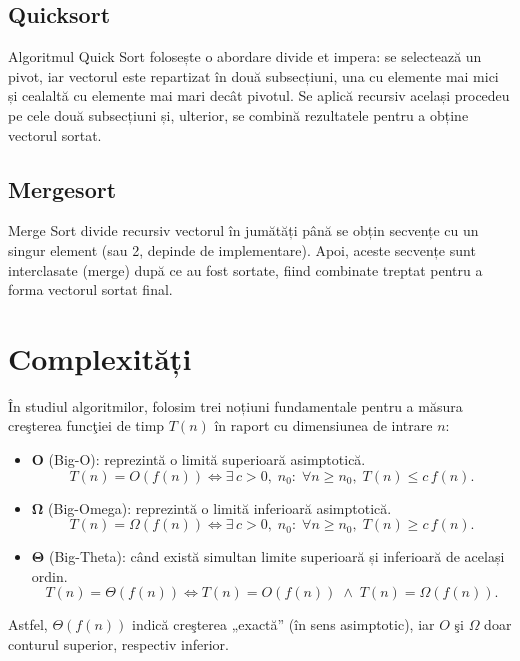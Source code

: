 \documentclass[11pt,a4paper]{article}
\theoremstyle{definition}
\theoremstyle{plain}
\theoremstyle{remark}
\begin{document}
\subsection{Quicksort}
Algoritmul Quick Sort folosește o abordare divide et impera: se selectează un pivot, iar vectorul este repartizat în două subsecțiuni, una cu elemente mai mici și cealaltă cu elemente mai mari decât pivotul. Se aplică recursiv același procedeu pe cele două subsecțiuni și, ulterior, se combină rezultatele pentru a obține vectorul sortat.\\

\subsection{Mergesort}
Merge Sort divide recursiv vectorul în jumătăți până se obțin secvențe cu un singur element (sau 2, depinde de implementare). Apoi, aceste secvențe sunt interclasate (merge) după ce au fost sortate, fiind combinate treptat pentru a forma vectorul sortat final.\\

\section{Complexități}

În studiul algoritmilor, folosim trei noțiuni fundamentale pentru a măsura creşterea funcţiei de timp \(T(n)\) în raport cu dimensiunea de intrare \(n\):

\begin{itemize}
  \item \(\mathbf{O}\) (Big-O): reprezintă o limită superioară asimptotică.
    \[
      T(n) = O(f(n)) \iff \exists\, c>0,\; n_0:\;\forall n\ge n_0,\; T(n)\le c\,f(n).
    \]
  \item \(\boldsymbol{\Omega}\) (Big-Omega): reprezintă o limită inferioară asimptotică.
    \[
      T(n) = \Omega(f(n)) \iff \exists\, c>0,\; n_0:\;\forall n\ge n_0,\; T(n)\ge c\,f(n).
    \]
  \item \(\boldsymbol{\Theta}\) (Big-Theta): când există simultan limite superioară și inferioară de același ordin.
    \[
      T(n) = \Theta(f(n)) \iff T(n) = O(f(n)) \;\wedge\; T(n) = \Omega(f(n)).
    \]
\end{itemize}

\noindent
Astfel, \(\Theta(f(n))\) indică creşterea „exactă” (în sens asimptotic), iar $O$ şi $\Omega$ doar conturul superior, respectiv inferior.
\end{document}
